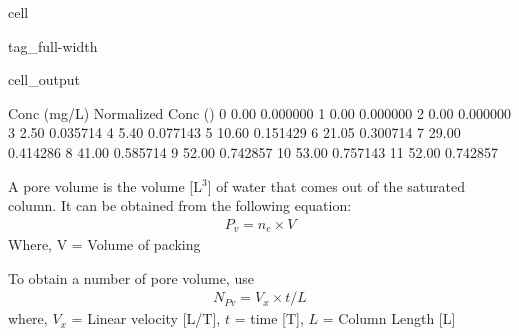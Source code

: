 \documentclass[letterpaper,10pt,english]{jupyterBook}
\begin{document}
\begin{sphinxuseclass}{cell}
\begin{sphinxuseclass}{tag_full-width}
\begin{sphinxVerbatimOutput}
\begin{sphinxuseclass}{cell_output}
\begin{sphinxVerbatim}[commandchars=\\\{\}]
    Conc (mg/L)  Normalized Conc ()
0          0.00            0.000000
1          0.00            0.000000
2          0.00            0.000000
3          2.50            0.035714
4          5.40            0.077143
5         10.60            0.151429
6         21.05            0.300714
7         29.00            0.414286
8         41.00            0.585714
9         52.00            0.742857
10        53.00            0.757143
11        52.00            0.742857
\end{sphinxVerbatim}

\noindent{}

\end{sphinxuseclass}\end{sphinxVerbatimOutput}

\end{sphinxuseclass}
\end{sphinxuseclass}
\sphinxAtStartPar
{}

\sphinxAtStartPar
A pore volume is the volume {[}L\(^3\){]} of water that comes out of the saturated column. It can be obtained from the following equation:
\begin{equation*}
\begin{split}
P_v = n_e \times V 
\end{split}
\end{equation*}
\sphinxAtStartPar
Where, V = Volume of packing

\sphinxAtStartPar
To obtain a number of pore volume, use
\begin{equation*}
\begin{split}
N_{Pv} = V_x \times t/L
\end{split}
\end{equation*}
\sphinxAtStartPar
where, \(V_x\) = Linear velocity {[}L/T{]}, \(t\)  = time {[}T{]}, \(L\) = Column Length {[}L{]}
\end{document}
